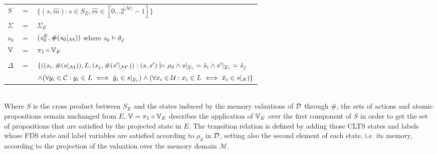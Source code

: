 \vspace{1em}
\begin{tabular}{ l c l }
	$S$ &$=$& $\{(s,\hat{m}) : s \in S_E, \hat{m} \in [0\ldots2^{|\mathcal{M}|}-1] \}$\\
	$\Sigma$ &$=$&$\Sigma_E$\\	
	$s_0$&$=$&$(s_0^{E}, \#(s_0|_{\mathcal{M}}))$ where $s_0 \models \theta_d$ \\
	$\mathbb{V}$&$=$&$\pi_1 \circ \mathbb{V}_E$\\
	&&\\
	$\Delta$&$=$&$\{((s_i,\#(s|_{\mathcal{M}})),L,(s_j,\#(s'|_{\mathcal{M}'})): (s, s') \models \rho_d \wedge  s|_{{\mathcal{Y}}_s} = \hat{s}_{i}  \wedge s'|_{{\mathcal{Y}}_s} = \hat{s}_{j}$ \\
	&&$\wedge (\forall y_i \in \mathcal{C} : y_i \in L \iff \hat{y}_i \in s|_{{\mathcal{Y}}_c})  \wedge (\forall x_i \in \mathcal{U} : x_i \in L \iff \hat{x}_i \in s|_{{\mathcal{X}}})  \}$\\
\end{tabular}
\vspace{1em}
\\
Where $S$ is the cross product between $S_E$ and the states induced by the memory valuations of $\mathcal{D}$ through $\#$, the sets of actions and atomic propositions remain unchanged from $E$, $\mathbb{V}=\pi_1 \circ \mathbb{V}_E$ describes the application of $\mathbb{V}_E$ over the first component of $S$ in order to get the set of propositions that are satisfied by the projected state in $E$. The transition relation is defined by adding those CLTS states and labels whose FDS state and label variables are satisfied according to $\rho_d$ in $\mathcal{D}$, setting also the second element of each state, i.e. its memory, according to the projection of the valuation over the memory domain $\mathcal{M}$.

